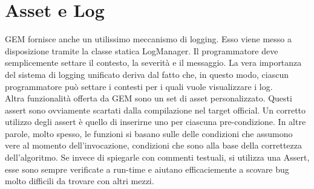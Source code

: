 \section{Asset e Log}

GEM fornisce anche un utilissimo meccanismo di logging. Esso viene messo a disposizione tramite la classe statica LogManager. Il programmatore deve semplicemente settare il contesto, la severità e il messaggio. La vera importanza del sistema di logging unificato deriva dal fatto che, in questo modo, ciascun programmatore può settare i contesti per i quali vuole visualizzare i log.\\

Altra funzionalità offerta da GEM sono un set di asset personalizzato. Questi assert sono ovviamente scartati dalla compilazione nel target official. Un corretto utilizzo degli assert è quello di inserirne uno per ciascuna pre-condizione. In altre parole, molto spesso, le funzioni si basano sulle delle condizioni che assumono vere al momento dell'invocazione, condizioni che sono alla base della correttezza dell'algoritmo. Se invece di spiegarle con commenti testuali, si utilizza una Assert, esse sono sempre verificate a run-time e aiutano efficaciemente a scovare bug molto difficili da trovare con altri mezzi.